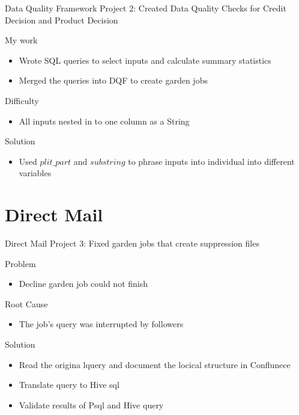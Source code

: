 \documentclass{beamer}
\begin{document}
\begin{frame}{Data Quality Framework}
Project 2: Created Data Quality Checks for Credit Decision and Product Decision
    \begin{block}{My work}
		\begin{itemize}
		\item Wrote SQL queries to select inputs and calculate summary
        statistics 
		\item Merged the queries into DQF to create garden jobs 
		\end{itemize}
    \end{block}

    \begin{block}{Difficulty}
		\begin{itemize}
		\item All inputs nested in to one column as a String 
        \end{itemize}
    \end{block}

    \begin{block}{Solution}
		\begin{itemize}
		\item Used $plit\_part$ and $substring$ to phrase inputs into individual
        into different variables 
		\end{itemize}
    \end{block}
\end{frame}
\section{Direct Mail}
\begin{frame}{Direct Mail}
Project 3: Fixed garden jobs that create suppression files 
    \begin{block}{Problem}
		\begin{itemize}
		\item Decline garden job could not finish  
		\end{itemize}
    \end{block}

    \begin{block}{Root Cause}
		\begin{itemize}
		\item The job's query was interrupted by followers 
        \end{itemize}
    \end{block}

    \begin{block}{Solution}
		\begin{itemize}
		\item Read the origina lquery and document the locical structure in
        Conflunece 
		\item Translate query to Hive sql
        \item Validate results of Psql and Hive query
		\end{itemize}
    \end{block}
\end{frame}
\end{document}
